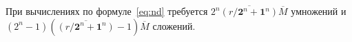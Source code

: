При вычислениях по формуле~\eqref{eq:nd} требуется
$2^n \overline{(r/\mathbf{2}^n+\mathbf{1}^n)} \overline{M}$
умножений и
$(2^n-1) (\overline{(r/\mathbf{2}^n+\mathbf{1}^n)} -1)  \overline{M}$
сложений. 



\begin{comment}
\emph{Двумерный случай:}

\begin{equation*}
  \begin{split}
    G_r[m_1,m_2] &= 
    \sum_{i_1 = 0}^{r_1/2 +1} \sum_{i_2 = 0}^{r_2/2 +1}
        F \left[ \left \lfloor {m_1}/{N_1} \right \rfloor - i_1, \left \lfloor {m_2}/{N_2} \right \rfloor - i_2\right]
      \Psi_{r_1+2,r_2+2}[i_1N_1 + m_1\bmod N_1,i_2N_2 + m_2\bmod N_2] 
       + \\
    &  +
      F \left[\left\lfloor {m_1}/{N_1} \right \rfloor + (i_1+1), \left\lfloor {m_2}/{N_2} \right \rfloor + (i_2+1)  \right]
      \Psi_{r_1+2,r_2+2}[(i_1+1)N_1 - m_1 \bmod N_1,(i_2+1)N_2 - m_2 \bmod N_2]
  \end{split}
\end{equation*}
  
\end{comment}


